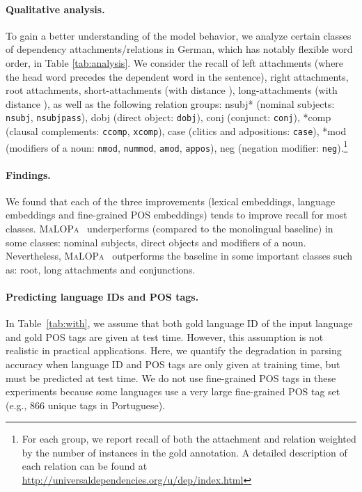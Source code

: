 \documentclass[11pt]{article}
\newcommand{\malopa}{\textsc{MaLOPa}}
\begin{document}
\paragraph{Qualitative analysis.}
To gain a better understanding of the model behavior, we analyze certain classes of dependency attachments/relations in German, which has notably flexible word order, in Table \ref{tab:analysis}.
We consider the recall of left attachments (where the head word precedes the dependent word in the sentence), right attachments, root attachments, short-attachments (with distance ), long-attachments (with distance ), as well as the following relation groups: nsubj* (nominal subjects: \texttt{nsubj}, \texttt{nsubjpass}), dobj (direct object: \texttt{dobj}), conj (conjunct: \texttt{conj}), *comp (clausal complements: \texttt{ccomp}, \texttt{xcomp}), case (clitics and adpositions: \texttt{case}), *mod (modifiers of a noun: \texttt{nmod}, \texttt{nummod}, \texttt{amod}, \texttt{appos}), neg (negation modifier: \texttt{neg}).\footnote{For each group, we report recall of both the attachment and relation weighted by the number of instances in the gold annotation. A detailed description of each relation can be found at \url{http://universaldependencies.org/u/dep/index.html}}

\paragraph{Findings.} 
We found that each of the three improvements (lexical embeddings, language embeddings and fine-grained POS embeddings) tends to improve recall for most classes.
\malopa~ underperforms (compared to the monolingual baseline) in some classes: nominal subjects, direct objects and modifiers of a noun.
Nevertheless, \malopa~ outperforms the baseline in some important classes such as: root, long attachments and conjunctions.

\paragraph{Predicting language IDs and POS tags.}
In Table~\ref{tab:with}, we assume that both gold language ID of the input language and gold POS tags are given at test time.
However, this assumption is not realistic in practical applications.
Here, we quantify the degradation in parsing accuracy when language ID and POS tags are only given at training time, but must be predicted at test time. 
We do not use fine-grained POS tags in these experiments because some languages use a very large fine-grained POS tag set (e.g., 866 unique tags in Portuguese).
\end{document}

